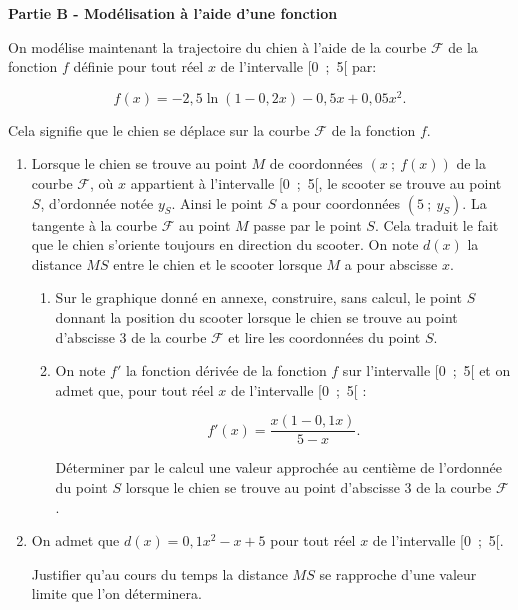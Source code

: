 \documentclass[10pt,a4paper]{article}
\begin{document}
\bigskip
 
\textbf{Partie B - Modélisation à l'aide d'une fonction}
 
 \medskip
 
On modélise maintenant la trajectoire du chien à l'aide de la courbe $\mathcal{F}$ de la fonction $f$ définie pour tout réel $x$ de l'intervalle [0~;~5[ par:
 
\[f(x) = -2,5\ln (1 - 0, 2x) - 0,5x + 0,05x^2.\]
 
 \medskip
 
Cela signifie que le chien se déplace sur la courbe $\mathcal{F}$ de la fonction $f$.
 
 \medskip
 
\begin{enumerate}
\item Lorsque le chien se trouve au point $M$ de coordonnées $(x~;~f(x))$ de la courbe $\mathcal{F}$, où $x$  appartient à l'intervalle [0~;~5[, le scooter se trouve au point $S$, d'ordonnée notée $y_S$. Ainsi le point $S$
a pour coordonnées $\left(5~;~y_S\right)$. La tangente à la courbe $\mathcal{F}$ au point $M$ passe par le point $S$. Cela traduit le fait que le chien s'oriente toujours en direction du scooter. On note $d(x)$ la distance $MS$ entre le chien et le scooter lorsque $M$ a pour abscisse $x$.
	\begin{enumerate}
		\item Sur le graphique  donné en annexe, construire, sans calcul, le point $S$ donnant la position du scooter lorsque le chien se trouve au point d'abscisse 3 de la courbe $\mathcal{F}$ et lire les
coordonnées du point $S$.
		\item On note $f'$ la fonction dérivée de la fonction $f$ sur l'intervalle [0~;~5[ et on admet que, pour tout réel $x$ de l'intervalle [0~;~5[ :

\[f'(x) = \dfrac{x(1  - 0,1x)}{5 - x}.\]

Déterminer par le calcul une valeur approchée au centième de l'ordonnée du point $S$ lorsque
le chien se trouve au point d'abscisse 3 de la courbe $\mathcal{F}$.
	\end{enumerate}
\item  On admet que $d(x) = 0,1x^2 - x + 5$ pour tout réel $x$ de l'intervalle [0~;~5[.

Justifier qu'au cours du temps la distance $MS$ se rapproche d'une valeur limite que l'on déterminera.
\end{enumerate}
\end{document}
